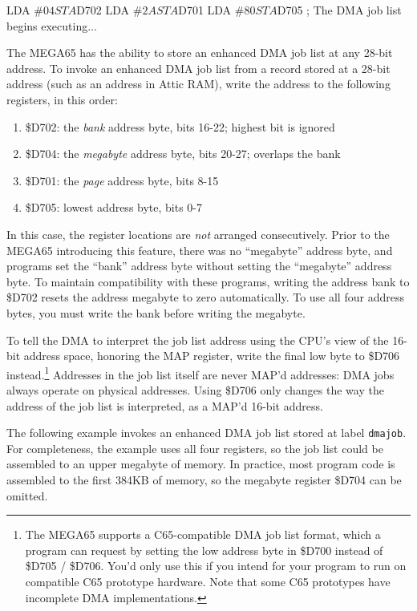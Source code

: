 \begin{asmcode}
LDA #$04
STA $D702
LDA #$2A
STA $D701
LDA #$80
STA $D705    ; The DMA job list begins executing...
\end{asmcode}

The MEGA65 has the ability to store an enhanced DMA job list at any 28-bit address. To invoke an enhanced DMA job list from a record stored at a 28-bit address (such as an address in Attic RAM), write the address to the following registers, in this order:

\begin{enumerate}
\item \$D702: the \emph{bank} address byte, bits 16-22; highest bit is ignored
\item \$D704: the \emph{megabyte} address byte, bits 20-27; overlaps the bank
\item \$D701: the \emph{page} address byte, bits 8-15
\item \$D705: lowest address byte, bits 0-7
\end{enumerate}

In this case, the register locations are \emph{not} arranged consecutively. Prior to the MEGA65 introducing this feature, there was no ``megabyte'' address byte, and programs set the ``bank'' address byte without setting the ``megabyte'' address byte. To maintain compatibility with these programs, writing the address bank to \$D702 resets the address megabyte to zero automatically. To use all four address bytes, you must write the bank before writing the megabyte.

To tell the DMA to interpret the job list address using the CPU's view of the 16-bit address space, honoring the MAP register, write the final low byte to \$D706 instead.\footnote{The MEGA65 supports a C65-compatible DMA job list format, which a program can request by setting the low address byte in \$D700 instead of \$D705 / \$D706. You'd only use this if you intend for your program to run on compatible C65 prototype hardware. Note that some C65 prototypes have incomplete DMA implementations.} Addresses in the job list itself are never MAP'd addresses: DMA jobs always operate on physical addresses. Using \$D706 only changes the way the address of the job list is interpreted, as a MAP'd 16-bit address.

The following example invokes an enhanced DMA job list stored at label {\tt dmajob}. For completeness, the example uses all four registers, so the job list could be assembled to an upper megabyte of memory. In practice, most program code is assembled to the first 384KB of memory, so the megabyte register \$D704 can be omitted.

